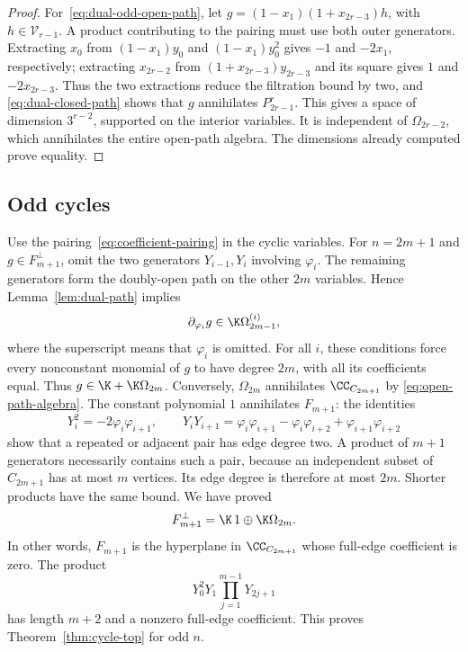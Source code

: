\begin{proof}
For~\eqref{eq:dual-odd-open-path}, let
$g=(1-x_1)(1+x_{2r-3})h$, with $h\in\mathcal V_{r-1}$.
A product contributing to the pairing must use both outer generators.
Extracting $x_0$ from $(1-x_1)y_0$ and $(1-x_1)y_0^2$ gives
$-1$ and $-2x_1$, respectively; extracting $x_{2r-2}$ from
$(1+x_{2r-3})y_{2r-3}$ and its square gives $1$ and $-2x_{2r-3}$.
Thus the two extractions reduce the filtration bound by two, and
\eqref{eq:dual-closed-path} shows that $g$ annihilates $P_{2r-1}^r$.
This gives a space of dimension $3^{r-2}$, supported on the interior
variables. It is independent of $\Omega_{2r-2}$, which annihilates the
entire open-path algebra. The dimensions already computed prove equality.
\end{proof}

\subsection{Odd cycles}
\label{sec:odd-cycles}

Use the pairing~\eqref{eq:coefficient-pairing} in the cyclic variables.
For $n=2m+1$ and $g\in F_{m+1}^\perp$, omit the two generators
$Y_{i-1},Y_i$ involving $\varphi_i$. The remaining generators form the
doubly-open path on the other $2m$ variables. Hence
Lemma~\ref{lem:dual-path} implies
\[
\partial_{\varphi_i}g\in\K\Omega_{2m-1}^{(i)},
\]
where the superscript means that $\varphi_i$ is omitted.
For all $i$, these conditions force every nonconstant monomial of $g$
to have degree $2m$, with all its coefficients equal. Thus
$g\in\K+\K\Omega_{2m}$.
Conversely, $\Omega_{2m}$ annihilates $\CC_{C_{2m+1}}$ by
\eqref{eq:open-path-algebra}. The constant polynomial $1$ annihilates
$F_{m+1}$: the identities
\begin{equation}\label{eq:cycle-adjacent-products}
Y_i^2=-2\varphi_i\varphi_{i+1},\qquad
Y_iY_{i+1}=\varphi_i\varphi_{i+1}-\varphi_i\varphi_{i+2}
                         +\varphi_{i+1}\varphi_{i+2}
\end{equation}
show that a repeated or adjacent pair has edge degree two. A product of
$m+1$ generators necessarily contains such a pair, because an independent
subset of $C_{2m+1}$ has at most $m$ vertices. Its edge degree is therefore
at most $2m$. Shorter products have the same bound. We have proved
\begin{equation}\label{eq:odd-cycle-annihilator}
F_{m+1}^\perp=\K\,1\oplus\K\Omega_{2m}.
\end{equation}
In other words, $F_{m+1}$ is the hyperplane in $\CC_{C_{2m+1}}$ whose
full-edge coefficient is zero. The product
\[
Y_0^2Y_1\prod_{j=1}^{m-1}Y_{2j+1}
\]
has length $m+2$ and a nonzero full-edge coefficient. This proves
Theorem~\ref{thm:cycle-top} for odd $n$.


